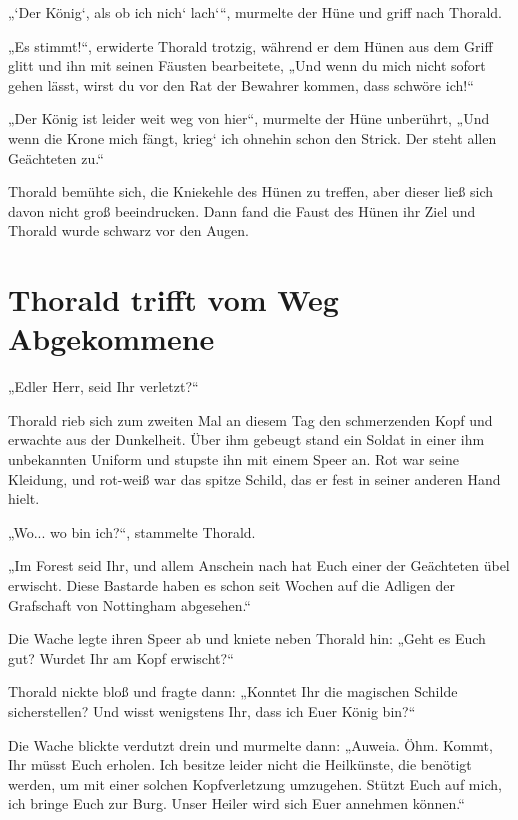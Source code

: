 \documentclass[10pt, a4paper, oneside]{book}
\begin{document}
„‘Der König‘, als ob ich nich‘ lach‘“, murmelte der Hüne und griff nach Thorald.

„Es stimmt!“, erwiderte Thorald trotzig, während er dem Hünen aus dem Griff glitt und ihn mit seinen Fäusten bearbeitete, „Und wenn du mich nicht sofort gehen lässt, wirst du vor den Rat der Bewahrer kommen, dass schwöre ich!“

„Der König ist leider weit weg von hier“, murmelte der Hüne unberührt, „Und wenn die Krone mich fängt, krieg‘ ich ohnehin schon den Strick. Der steht allen Geächteten zu.“

Thorald bemühte sich, die Kniekehle des Hünen zu treffen, aber dieser ließ sich davon nicht groß beeindrucken. Dann fand die Faust des Hünen ihr Ziel und Thorald wurde schwarz vor den Augen.













\newpage
\section{Thorald trifft vom Weg Abgekommene}

„Edler Herr, seid Ihr verletzt?“

Thorald rieb sich zum zweiten Mal an diesem Tag den schmerzenden Kopf und erwachte aus der Dunkelheit. Über ihm gebeugt stand ein Soldat in einer ihm unbekannten Uniform und stupste ihn mit einem Speer an. Rot war seine Kleidung, und rot-weiß war das spitze Schild, das er fest in seiner anderen Hand hielt.

„Wo... wo bin ich?“, stammelte Thorald.

„Im Forest seid Ihr, und allem Anschein nach hat Euch einer der Geächteten übel erwischt. Diese Bastarde haben es schon seit Wochen auf die Adligen der Grafschaft von Nottingham abgesehen.“

Die Wache legte ihren Speer ab und kniete neben Thorald hin: „Geht es Euch gut? Wurdet Ihr am Kopf erwischt?“

Thorald nickte bloß und fragte dann: „Konntet Ihr die magischen Schilde sicherstellen? Und wisst wenigstens Ihr, dass ich Euer König bin?“

Die Wache blickte verdutzt drein und murmelte dann: „Auweia. Öhm. Kommt, Ihr müsst Euch erholen. Ich besitze leider nicht die Heilkünste, die benötigt werden, um mit einer solchen Kopfverletzung umzugehen. Stützt Euch auf mich, ich bringe Euch zur Burg. Unser Heiler wird sich Euer annehmen können.“
\end{document}
